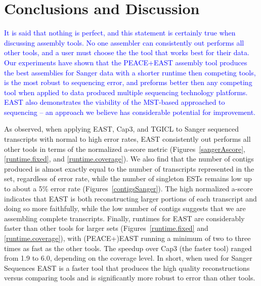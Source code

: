 \documentclass{bioinfo}
\newcommand{\peace} {{\small PEACE}}
\newcommand{\capthree} {{\small Cap3}}
\newcommand{\tgicl} {{\small TGICL}}
\newcommand{\east} {{\small EAST}}
\newcommand{\peast}{{\small PEACE+EAST}}
\begin{document}
\section*{Conclusions and Discussion}

\textcolor{blue}{It is said that nothing is perfect, and this statement is certainly
true when discussing assembly tools.  No one assembler can
consistently out performs all other tools, and a user must choose the
the tool that works best for their data.  Our experiments have shown
that the \peast\/ assembly tool produces the best assemblies for Sanger
data with a shorter runtime then competing tools, is the most robust
to sequencing error, and preforms better then any competing tool when
applied to data produced multiple sequencing technology platforms.
\east\/ also demonstrates the viability of the MST-based
approached to sequencing -- an approach we believe has considerable
potential for improvement.}

As observed, when applying \east, \capthree,
and \tgicl\/ to Sanger sequenced transcripts with normal to high error
rates, \east\/ consistently out performs all other tools in terms of
the normalized a-score metric (Figures~\ref{sangerAscore},
\ref{runtime.fixed}, and \ref{runtime.coverage}).  We also find that
the number of contigs produced is almost exactly equal to the number
of transcripts represented in the set, regardless of error rate, while
the number of singleton ESTs remains low up to about a 5\% error rate
(Figures~\ref{contigsSanger}).  The high normalized a-score indicates
that \east\/ is both reconstructing larger portions of each transcript
and doing so more faithfully, while the low number of contigs suggests
that we are assembling complete transcripts.  Finally, runtimes for
\east\/ are considerably faster than other tools for larger sets
(Figures~\ref{runtime.fixed} and \ref{runtime.coverage}), with
(\peace+)\east\/ running a minimum of two to three times as fast as
the other tools.  The speedup over \capthree\/ (the faster tool)
ranged from 1.9 to 6.0, depending on the coverage level.  In short,
when used for Sanger Sequences \east\/ is a faster tool that produces
the high quality reconstructions versus comparing tools and is
significantly more robust to error than other tools.

\end{document}
